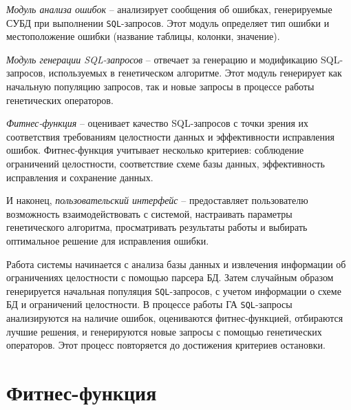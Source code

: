 \documentclass[master,paper]{pmk-graduate}
\begin{document}
\textit{Модуль анализа ошибок} -- анализирует сообщения об ошибках, генерируемые СУБД при выполнении \texttt{SQL}-запросов. Этот модуль определяет тип ошибки и местоположение ошибки (название таблицы, колонки, значение).

\textit{Модуль генерации {SQL}-запросов} -- отвечает за генерацию и модификацию {SQL}-запросов, используемых в генетическом алгоритме. Этот модуль генерирует как начальную популяцию запросов, так и новые запросы в процессе работы генетических операторов.

\textit{Фитнес-функция} -- оценивает качество {SQL}-запросов с точки зрения их соответствия требованиям целостности данных и эффективности исправления ошибок. Фитнес-функция учитывает несколько критериев: соблюдение ограничений целостности, соответствие схеме базы данных, эффективность исправления и сохранение данных.

И наконец, \textit{пользовательский интерфейс} -- предоставляет пользователю возможность взаимодействовать с системой, настраивать параметры генетического алгоритма, просматривать результаты работы и выбирать оптимальное решение для исправления ошибки.

Работа системы начинается с анализа базы данных и извлечения информации об ограничениях целостности с помощью парсера БД. Затем случайным образом генерируется начальная популяция \texttt{SQL}-запросов, с учетом информации о схеме БД и ограничений целостности. В процессе работы ГА \texttt{SQL}-запросы анализируются на наличие ошибок, оцениваются фитнес-функцией, отбираются лучшие решения, и генерируются новые запросы с помощью генетических операторов. Этот процесс повторяется до достижения критериев остановки.

\section{Фитнес-функция}
\label{sec22}
\end{document}
